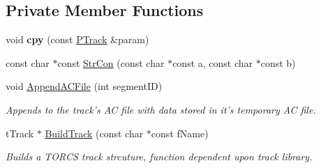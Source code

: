 \subsection*{Private Member Functions}
\begin{DoxyCompactItemize}
\item 
\hypertarget{classprocedural_1_1_p_track_af6c28642d717a75fcc43bfead98ad843}{void {\bfseries cpy} (const \hyperlink{classprocedural_1_1_p_track}{P\-Track} \&param)}\label{classprocedural_1_1_p_track_af6c28642d717a75fcc43bfead98ad843}

\item 
const char $\ast$const \hyperlink{classprocedural_1_1_p_track_a359e7b04e99952af6c0905f05d760a84}{Str\-Con} (const char $\ast$const a, const char $\ast$const b)
\item 
void \hyperlink{classprocedural_1_1_p_track_a312fb6c1a1a46ac7ce486f5c0e7b3834}{Append\-A\-C\-File} (int segment\-I\-D)
\begin{DoxyCompactList}\small\item\em Appends to the track's A\-C file with data stored in it's temporary A\-C file. \end{DoxyCompactList}\item 
t\-Track $\ast$ \hyperlink{classprocedural_1_1_p_track_af65527645c346e45ffbe261757cf09dc}{Build\-Track} (const char $\ast$const f\-Name)
\begin{DoxyCompactList}\small\item\em Builds a T\-O\-R\-C\-S track strcuture, function dependent upon track library. \end{DoxyCompactList}\end{DoxyCompactItemize}

